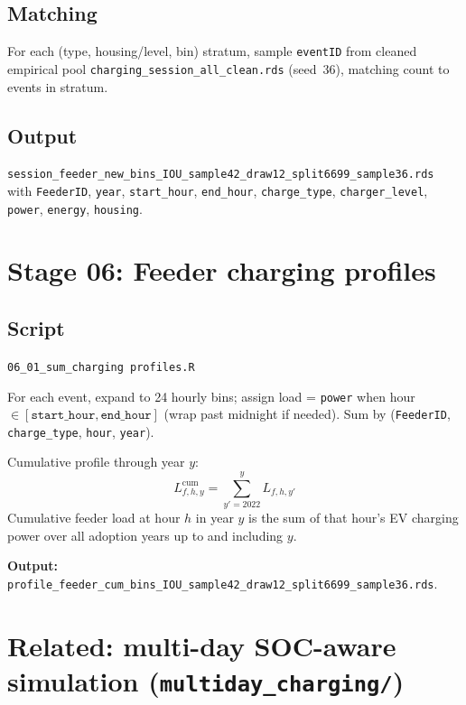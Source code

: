 \documentclass[11pt,a4paper]{article}
\begin{document}
\subsection{Matching}
For each (type, housing/level, bin) stratum, sample \texttt{eventID} from cleaned empirical pool \texttt{charging\_session\_all\_clean.rds} (seed~36), matching count to events in stratum.

\subsection{Output}
\texttt{session\_feeder\_new\_bins\_IOU\_sample42\_draw12\_split6699\_sample36.rds} with \texttt{FeederID}, \texttt{year}, \texttt{start\_hour}, \texttt{end\_hour}, \texttt{charge\_type}, \texttt{charger\_level}, \texttt{power}, \texttt{energy}, \texttt{housing}.

\section{Stage 06: Feeder charging profiles}

\subsection{Script}
\texttt{06\_01\_sum\_charging profiles.R}

For each event, expand to 24 hourly bins; assign load = \texttt{power} when hour $\in [\texttt{start\_hour}, \texttt{end\_hour}]$ (wrap past midnight if needed). Sum by (\texttt{FeederID}, \texttt{charge\_type}, \texttt{hour}, \texttt{year}).

Cumulative profile through year $y$:
\begin{equation}
  L^{\text{cum}}_{f,h,y} = \sum_{y'=2022}^{y} L_{f,h,y'}
\end{equation}
\noindent Cumulative feeder load at hour $h$ in year $y$ is the sum of that hour's EV charging power over all adoption years up to and including $y$.

\textbf{Output:} \texttt{profile\_feeder\_cum\_bins\_IOU\_sample42\_draw12\_split6699\_sample36.rds}.

\section{Related: multi-day SOC-aware simulation (\texttt{multiday\_charging/})}
\end{document}
